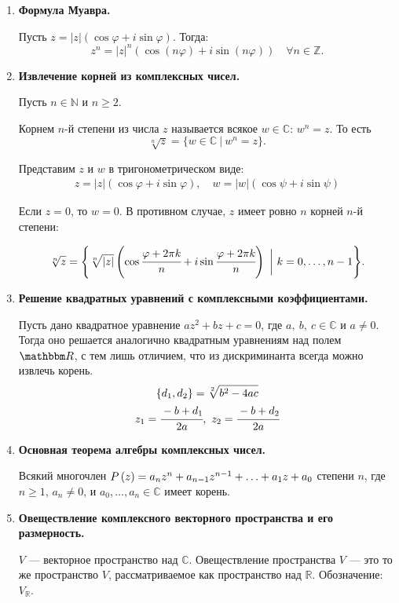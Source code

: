 \begin{enumerate}
\item \textbf{Формула Муавра.}

Пусть $z = |z|\left(\cos\varphi + i \sin \varphi\right)$. Тогда:
\[z^n = |z|^n\left(\cos\left(n\varphi\right)+i\sin\left(n\varphi\right)\right) \quad \forall n \in \mathbb{Z}.
\]

\item \textbf{Извлечение корней из комплексных чисел.}

Пусть $n\in\mathbb N$ и $n\geqslant2$.

Корнем $n$-й степени из числа $z$ называется всякое $w\in\mathbb C$: $w^n=z$. То есть
\[
\sqrt[n]{z} = \{w\in\mathbb C\ |\ w^n = z\}.
\]

Представим $z$ и $w$ в тригонометрическом виде:
\begin{gather*}
z = |z|\left(\cos\varphi+i\sin\varphi\right), \quad w = |w|\left(\cos\psi+i\sin\psi\right)
\end{gather*}

Если $z=0$, то $w=0$. В противном случае, $z$ имеет ровно $n$ корней $n$-й степени:

\[ \sqrt[n]{z} = \Biggl\{\sqrt[n]{|z|}\left(\cos\cfrac{\varphi+2\pi k}{n}+i\sin\cfrac{\varphi+2\pi k }{n}\right)\ \biggl|\ k=0,\ldots,n-1\Biggr\}.
\]

\item \textbf{Решение квадратных уравнений с комплексными коэффициентами.}

Пусть дано квадратное уравнение $az^2+bz+c=0$, где $a,\ b,\ c\in\mathbb{C}$ и 	$ a \neq 0$. Тогда оно решается аналогично квадратным уравнениям над полем $\R$, с тем лишь отличием, что из дискриминанта всегда можно извлечь корень.
\begin{gather*}
\{d_1,d_2\} = \sqrt[2]{b^2-4ac} \\
z_1 = \cfrac{-b+d_1}{2a},\ z_2 = \cfrac{-b+d_2}{2a}
\end{gather*}

\item \textbf{Основная теорема алгебры комплексных чисел.}

Всякий многочлен $P\left(z\right) = a_nz^n + a_{n-1}z^{n-1} + \ldots \hm{+} a_1z + a_0$ степени $n$, где $n \geqslant 1$, $a_n \neq 0$, и $a_0,\ldots,a_n \in \mathbb{C}$ имеет корень.

\item \textbf{Овеществление комплексного векторного пространства и его размерность.}

$V$ --- векторное пространство над $\mathbb{C}$. Овеществление пространства $V$ --- это то же пространство $V$, рассматриваемое как пространство над $\mathbb{R}$. Обозначение: $V_\mathbb{R}$.


\end{enumerate}
